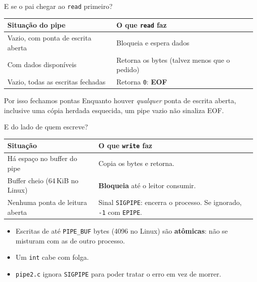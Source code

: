 \documentclass[aspectratio=169]{beamer}
\begin{document}
\begin{frame}{E se o pai chegar ao \texttt{read} primeiro?}
\begin{center}
\begin{tabular}{@{}p{6.2cm}p{6.2cm}@{}}
\toprule
\textbf{Situação do pipe} & \textbf{O que \texttt{read} faz} \\
\midrule
Vazio, com ponta de escrita aberta & Bloqueia e espera dados \\
Com dados disponíveis & Retorna os bytes (talvez menos que o pedido) \\
Vazio, todas as escritas fechadas & Retorna \texttt{0}: \textbf{EOF} \\
\bottomrule
\end{tabular}
\end{center}

\vspace{0.8em}
\begin{alertblock}{Por isso fechamos pontas}
Enquanto houver \emph{qualquer} ponta de escrita aberta, inclusive uma cópia herdada esquecida, um pipe vazio não sinaliza EOF.
\end{alertblock}
\end{frame}

\begin{frame}{E do lado de quem escreve?}
\begin{center}
\small
\begin{tabular}{@{}p{5.6cm}p{7.2cm}@{}}
\toprule
\textbf{Situação} & \textbf{O que \texttt{write} faz} \\
\midrule
Há espaço no buffer do pipe & Copia os bytes e retorna. \\
Buffer cheio (64\,KiB no Linux) & \textbf{Bloqueia} até o leitor consumir. \\
Nenhuma ponta de leitura aberta & Sinal \texttt{SIGPIPE}: encerra o processo. Se ignorado, \texttt{-1} com \texttt{EPIPE}. \\
\bottomrule
\end{tabular}
\end{center}

\vspace{0.5em}
\begin{itemize}
    \item Escritas de até \texttt{PIPE\_BUF} bytes (4096 no Linux) são \textbf{atômicas}: não se misturam com as de outro processo.
    \item Um \texttt{int} cabe com folga.
    \item \texttt{pipe2.c} ignora \texttt{SIGPIPE} para poder tratar o erro em vez de morrer.
\end{itemize}
\end{frame}
\end{document}
